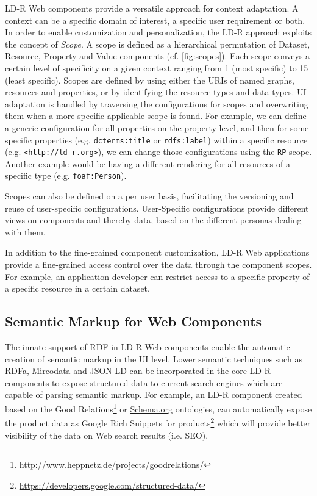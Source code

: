 \documentclass{acm_proc_article-sp}
\begin{document}
LD-R Web components provide a versatile approach for context adaptation.
A context can be a specific domain of interest, a specific user requirement or both.
In order to enable customization and personalization, the LD-R approach exploits the concept of \emph{Scope}.
A scope is defined as a hierarchical permutation of Dataset, Resource, Property and Value components (cf. \autoref{fig:scopes}).
Each scope conveys a certain level of specificity on a given context ranging from 1 (most specific) to 15 (least specific).
Scopes are defined by using either the URIs of named graphs, resources and properties, or by identifying the resource types and data types.
UI adaptation is handled by traversing the configurations for scopes and overwriting them when a more specific applicable scope is found.
For example, we can define a generic configuration for all properties on the property level, and then for some specific properties (e.g. \texttt{dcterms:title} or \texttt{rdfs:label}) within a specific resource (e.g. \texttt{<http://ld-r.org>}), we can change those configurations using the \texttt{RP} scope.
Another example would be having a different rendering for all resources of a specific type (e.g. \texttt{foaf:Person}).

Scopes can also be defined on a per user basis, facilitating the versioning and reuse of user-specific configurations.
User-Specific configurations provide different views on components and thereby data, based on the different personas dealing with them.

In addition to the fine-grained component customization, LD-R Web applications provide a fine-grained access control over the data through the component scopes.
For example, an application developer can restrict access to a specific property of a specific resource in a certain dataset.

\subsection{Semantic Markup for Web Components}
\label{sec:markup}
The innate support of RDF in LD-R Web components enable the automatic creation of semantic markup in the UI level.
Lower semantic techniques such as RDFa, Mircodata and JSON-LD can be incorporated in the core LD-R components to expose structured data to current search engines which are capable of parsing semantic markup.
For example, an LD-R component created based on the Good Relations\footnote{\url{http://www.heppnetz.de/projects/goodrelations/}} or \url{Schema.org} ontologies, can automatically expose the product data as Google Rich Snippets for products\footnote{\url{https://developers.google.com/structured-data/}} which will provide better visibility of the data on Web search results (i.e. SEO).
\end{document}
